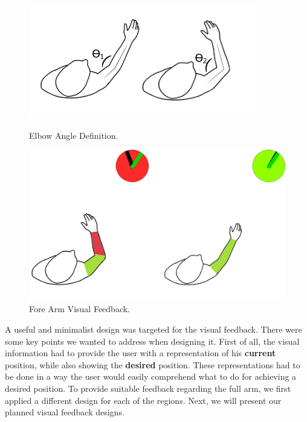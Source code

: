 \begin{figure}[!t]
  \centering
  \includegraphics[width=0.7\linewidth]{imgs/approach/elbowangle}
    \caption{Elbow Angle Definition.}
    \label{fig:elbowangle}
    \endminipage\hfill
{}
  \centering
  \includegraphics[width=0.9\linewidth]{imgs/approach/forearmfeedback}
    \caption{Fore Arm Visual Feedback.}
    \label{fig:forearmfeedback}
    \endminipage
\end{figure}




A useful and minimalist design was targeted for the visual feedback. There were some key points we wanted to address when designing it.
First of all, the visual information had to provide the user with a representation of his \textbf{current} position, while also showing the \textbf{desired} position. 
These representations had to be done in a way the user would easily comprehend what to do for achieving a desired position.
To provide suitable feedback regarding the full arm, we first applied a different design for each of the regions. Next, we will present our planned visual feedback designs.

